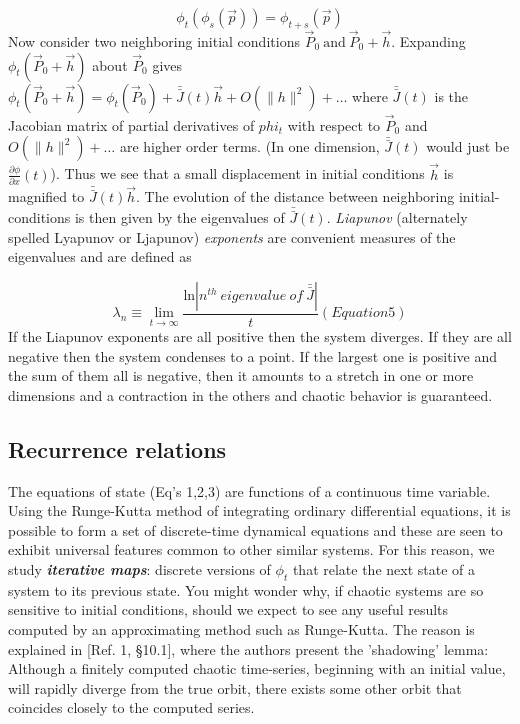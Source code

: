 \documentclass{../lab}
\begin{document}
\begin{equation}
    \phi_t(\phi_s(\vec p))=\phi_{t+s}(\vec p)
\end{equation}
Now consider two neighboring initial conditions $ \vec P_0~\mbox{and}~\vec P_0+\vec h $. Expanding $ \phi_t(\vec P_0+\vec h) $ about $ \vec P_0 $ gives $ \phi_t(\vec P_0+\vec h)= \phi_t(\vec P_0)+\bar{\bar J}(t)\vec h+O(\| h\|^2)+\ldots $ where $ \bar{\bar J}(t) $ is the Jacobian matrix of partial derivatives of $ phi_t $ with respect to $ \vec P_0 $ and $ O(\| h\|^2)+\ldots $ are higher order terms. (In one dimension, $ \bar{\bar J}(t) $ would just be $ \frac{\partial\phi}{\partial x}(t) $). Thus we see that a small displacement in initial conditions $ \vec h $ is magnified to $ \bar{\bar J}(t)\vec h $. The evolution of the distance between neighboring initial-conditions is then given by the eigenvalues of $ \bar{\bar J}(t) $. \emph{Liapunov }(alternately spelled Lyapunov or Ljapunov)\emph{ exponents} are convenient measures of the eigenvalues and are defined as

\begin{equation}
    \lambda_n\equiv \lim_{t \to \infty}\frac{\mbox{ln}| n^{th}~eigenvalue~of~\bar {\bar J}| }{t}  (Equation 5)
\end{equation}
If the Liapunov exponents are all positive then the system diverges. If they are all negative then the system condenses to a point. If the largest one is positive and the sum of them all is negative, then it amounts to a stretch in one or more dimensions and a contraction in the others and chaotic behavior is guaranteed.

\subsection{Recurrence relations}

The equations of state (Eq's 1,2,3) are functions of a continuous time variable. Using the Runge-Kutta method of integrating ordinary differential equations, it is possible to form a set of discrete-time dynamical equations and these are seen to exhibit universal features common to other similar systems. For this reason, we study \emph{\textbf{iterative maps}}: discrete versions of $ \phi_t $ that relate the next state of a system to its previous state. You might wonder why, if chaotic systems are so sensitive to initial conditions, should we expect to see any useful results computed by an approximating method such as Runge-Kutta. The reason is explained in [Ref. 1, §10.1], where the authors present the 'shadowing' lemma: Although a finitely computed chaotic time-series, beginning with an initial value, will rapidly diverge from the true orbit, there exists some other orbit that coincides closely to the computed series.
\end{document}
